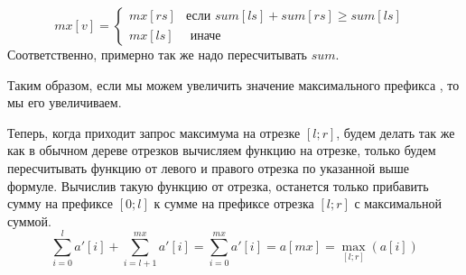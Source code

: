 \documentclass{article}
\begin{document}
\begin{itemize}
\begin{equation*}
	mx[v] = 
	\begin{cases}
	mx[rs] & \text{если $sum[ls] + sum[rs] \geq sum[ls]$ } \\
	mx[ls] & \text{  иначе}
	\end{cases}
\end{equation*}
Соответственно, примерно так же надо пересчитывать $sum$.

Таким образом, если мы можем увеличить значение максимального префикса , то мы его увеличиваем.

Теперь, когда приходит запрос максимума на отрезке $[l;r]$, будем делать так же как в обычном дереве отрезков вычисляем функцию на отрезке, только будем пересчитывать функцию от левого и правого отрезка по указанной выше формуле. Вычислив такую функцию от отрезка, останется только прибавить сумму на префиксе $[0;l]$ к сумме на префиксе отрезка $[l;r]$ с максимальной суммой. $$\sum_{i = 0}^{l}a'[i] + \sum_{i = l + 1}^{mx}a'[i] = \sum_{i = 0}^{mx}a'[i] = a[mx] = \max\limits_{[l;r]}(a[i])$$
\end{itemize}
\end{document}
